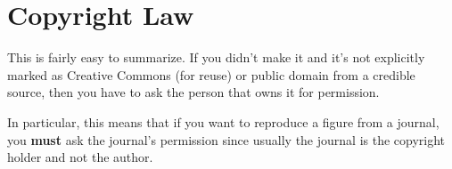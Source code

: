 \documentclass[paper=a4, fontsize=11pt]{scrartcl}
\numberwithin{equation}{section}        %
\numberwithin{figure}{section}            %
\numberwithin{table}{section}                %
\begin{document}
\section{Copyright Law}

This is fairly easy to summarize. If you didn't make it and it's not explicitly
marked as Creative Commons (for reuse) or public domain from a credible source,
then you have to ask the person that owns it for permission.

In particular, this means that if you want to reproduce a figure from a journal,
you \textbf{must} ask the journal's permission since usually the journal is the
copyright holder and not the author.

\end{document}
